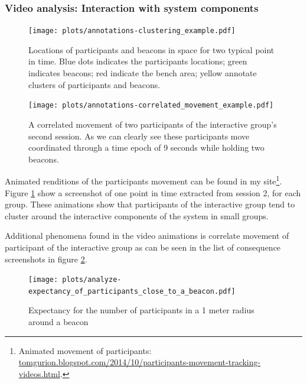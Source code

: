 \documentclass[a4paper,11pt]{article}
\begin{document}
{\subsubsection{Video analysis: Interaction with system components}\label{results:system}

\begin{figure}[!htb]
    \centering
    \texttt{[image: plots/annotations-clustering\_example.pdf]}
    \caption{Locations of participants and beacons in space for two typical point in time. Blue dots indicates the participants locations; green indicates beacons; red indicate the bench area; yellow annotate clusters of participants and beacons.}\label{plot:annotations-clustering_example}
\end{figure}

\begin{figure}[!htb]
    \centering
    \texttt{[image: plots/annotations-correlated\_movement\_example.pdf]}
    \caption{A correlated movement of two participants of the interactive group's second session. As we can clearly see these participants move coordinated through a time epoch of 9 seconds while holding two beacons.}\label{plot:annotations-correlated_movement_example}
\end{figure}

Animated renditions of the participants movement can be found in my site\footnote{Animated movement of participants: \href{http://tomgurion.blogspot.com/2014/10/participants-movement-tracking-videos.html}{tomgurion.blogspot.com/2014/10/participants-movement-tracking-videos.html}.}.
Figure \ref{plot:annotations-clustering_example} show a screenshot of one point in time extracted from session 2, for each group.
These animations show that participants of the interactive group tend to cluster around the interactive components of the system in small groups.

Additional phenomena found in the video animations is correlate movement of participant of the interactive group as can be seen in the list of consequence screenshots in figure \ref{plot:annotations-correlated_movement_example}.

\begin{figure}[!htb]
    \centering
    \texttt{[image: plots/analyze-expectancy\_of\_participants\_close\_to\_a\_beacon.pdf]}
    \caption{Expectancy for the number of participants in a 1 meter radius around a beacon}\label{plot:analyze-expectancy_of_participants_close_to_a_beacon}
\end{figure}

}
\end{document}
